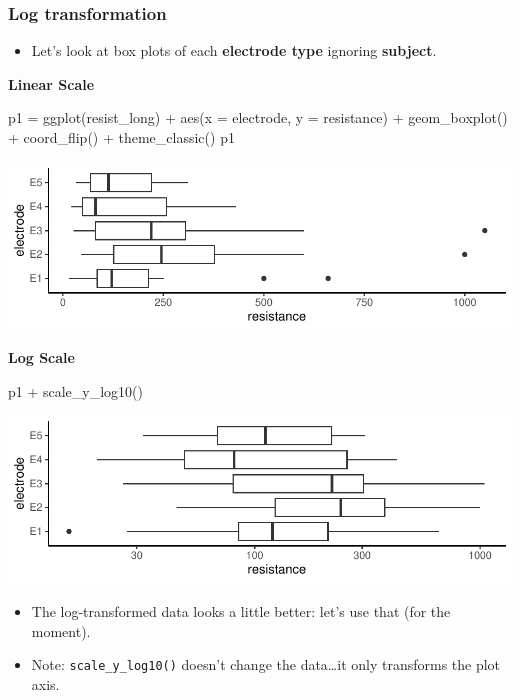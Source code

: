 \documentclass[a4paper]{article}\usepackage[]{graphicx}\usepackage[]{xcolor}
\makeatletter
\def\maxwidth{ %
  \ifdim\Gin@nat@width>\linewidth
    \linewidth
  \else
    \Gin@nat@width
  \fi
}
\makeatother
\begin{document}
\subsubsection{Log transformation}
\begin{itemize}
	\item Let's look at box plots of each \textcolor{mygreen}{\textbf{electrode type}} ignoring \textcolor{myred}{\textbf{subject}}.
\end{itemize}
\begin{minipage}[t]{0.49\textwidth}
\textbf{Linear Scale}
\begin{Schunk}
\begin{Sinput}
p1 = ggplot(resist_long) + 
  aes(x = electrode, y = resistance) + 
  geom_boxplot() + coord_flip() +
  theme_classic()
p1
\end{Sinput}


{\centering \includegraphics[width=\maxwidth]{figure/listings-unnamed-chunk-283-1} 

}

\end{Schunk}
\end{minipage}
\hspace{0.02\textwidth}
\begin{minipage}[t]{0.49\textwidth}
\textbf{Log Scale}
\begin{Schunk}
\begin{Sinput}
p1 + scale_y_log10()
\end{Sinput}


{\centering \includegraphics[width=\maxwidth]{figure/listings-unnamed-chunk-284-1} 

}

\end{Schunk}
\end{minipage}
\begin{itemize}
	\item The log-transformed data looks a little better: let's use that (for the moment).
	\item Note: \lstinline|scale_y_log10()| doesn't change the data\dots it only transforms the plot axis.
\end{itemize}
\end{document}

